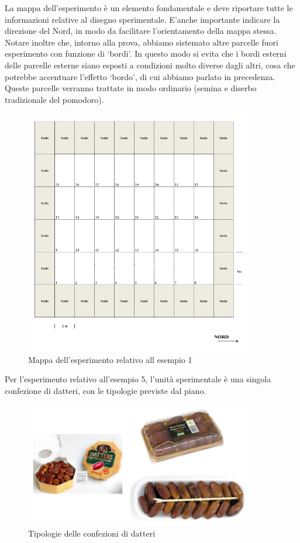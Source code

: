 \documentclass[a4paper,12pt,oneside]{book}
\begin{document}
La mappa dell'esperimento è un elemento fondamentale e deve riportare
tutte le informazioni relative al disegno sperimentale. E'anche
importante indicare la direzione del Nord, in modo da facilitare
l'orientamento della mappa stessa. Notare inoltre che, intorno alla
prova, abbiamo sistemato altre parcelle fuori esperimento con funzione
di `bordi'. In questo modo si evita che i bordi esterni delle parcelle
esterne siano esposti a condizioni molto diverse dagli altri, cosa che
potrebbe accentuare l'effetto `bordo', di cui abbiamo parlato in
precedenza. Queste parcelle verranno trattate in modo ordinario (semina
e diserbo tradizionale del pomodoro).

\begin{figure}
\centering
\includegraphics[width=0.90000\textwidth]{_images/Mappa1.png}
\caption{Mappa dell'esperimento relativo all esempio 1}
\end{figure}

Per l'esperimento relativo all'esempio 5, l'unità sperimentale è una
singola confezione di datteri, con le tipologie previste dal piano.

\begin{figure}
\centering
\includegraphics[width=0.90000\textwidth]{_images/Datteri.png}
\caption{Tipologie delle confezioni di datteri}
\end{figure}
\end{document}

